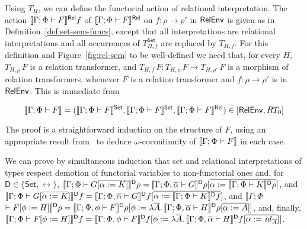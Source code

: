 \documentclass[runningheads]{llncs}
\newcommand{\set}{\mathsf{Set}}
\renewcommand{\id}{\mathit{id}}
\renewcommand{\id}{\mathit{id}}
\begin{document}
Using $T_H$, we can define the functorial action of relational
interpretation.  The action $\llbracket{\Gamma;\Phi \vdash F}\rrbracket^{\mathsf{Rel}} f$ of
$\llbracket{\Gamma;\Phi \vdash F}\rrbracket^{\mathsf{Rel}}$ on $f : \rho \to \rho'$ in $\mathsf{RelEnv}$
is given as in Definition~\ref{def:set-sem-funcs}, except that all
interpretations are relational interpretations and all occurrences of
$T^\set_{H,f}$ are replaced by $T_{H,f}$.  For this definition and
Figure~\ref{fig:rel-sem} to be well-defined we need that, for every
$H$, $T_{H,\rho}\,F$ is a relation transformer, and $T_{H,f}\, F :
T_{H,\rho}\, F \to T_{H,\rho'}\, F$ is a morphism of relation
transformers, whenever $F$ is a relation transformer and $f : \rho \to
\rho'$ is in $\mathsf{RelEnv}$. This is immediate from

\vspace*{-0.2in}

\begin{equation}\label{lem:rel-transf-morph}
\sem{\Gamma;\Phi \vdash F} = (\setsem{\Gamma;\Phi \vdash F},
\setsem{\Gamma;\Phi \vdash F},\relsem{\Gamma;\Phi \vdash F}) \in
       [\relenv,RT_0]
\end{equation}

\vspace*{-0.05in}

\noindent
The proof is a straightforward induction on the structure of $F$,
using an appropriate result from~\cite{jp19} to deduce
$\omega$-cocontinuity of $\llbracket{\Gamma;\Phi \vdash F}\rrbracket$ in each case.


We can prove by simultaneous induction that set and relational
interpretations of types respect demotion of functorial variables to
non-functorial ones and, for $\mathsf D \in \{\set,\rel\}$,
$\llbracket{\Gamma;\Phi \vdash G[\overline{\alpha := K}]}\rrbracket^{\mathsf D}\rho =
\llbracket{\Gamma;\Phi,\overline{\alpha} \vdash G}\rrbracket^{\mathsf D}\rho[\overline{\alpha :=
    \llbracket{\Gamma;\Phi \vdash K}\rrbracket^{\mathsf D}\rho}]$, and
$\llbracket{\Gamma;\Phi \vdash G[\overline{\alpha := K}]}\rrbracket^{\mathsf D}f =
\llbracket{\Gamma;\Phi,\overline{\alpha} \vdash G}\rrbracket^{\mathsf D}f[\overline{\alpha :=
    \llbracket{\Gamma;\Phi \vdash K}\rrbracket^{\mathsf D}f}]$, and $\llbracket
\Gamma; \Phi$ $\vdash F[\phi := H] \rrbracket^{\mathsf D} \rho =
\llbracket{\Gamma; \Phi, \phi \vdash F}\rrbracket^{\mathsf D}\rho [\phi := \lambda
  \overline{A}.\, \llbracket{\Gamma;\Phi,\overline{\alpha}\vdash H}\rrbracket^{\mathsf
    D}\rho[\overline{\alpha := A}]]$, and, finally, $\sem{\Gamma; \Phi
  \vdash F[\phi := H]}^{\mathsf D}f = \sem{\Gamma; \Phi, \phi \vdash
  F}^{\mathsf D}f [\phi := \lambda
  \ol{A}.\,\sem{\Gamma;\Phi,\overline{\alpha}\vdash H}^{\mathsf
    D}f[\overline{\alpha := \id_{\ol{A}}}]]$.
\end{document}
